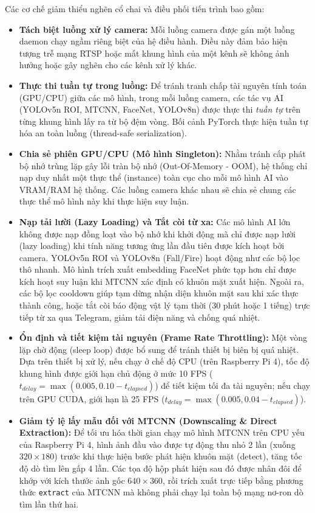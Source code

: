 \documentclass[12pt,a4paper]{article}
\begin{document}
Các cơ chế giảm thiểu nghẽn cổ chai và điều phối tiến trình bao gồm:
\begin{itemize}
    \item \textbf{Tách biệt luồng xử lý camera:} Mỗi luồng camera được gán một luồng daemon chạy ngầm riêng biệt của hệ điều hành. Điều này đảm bảo hiện tượng trễ mạng RTSP hoặc mất khung hình của một kênh sẽ không ảnh hưởng hoặc gây nghẽn cho các kênh xử lý khác.
    \item \textbf{Thực thi tuần tự trong luồng:} Để tránh tranh chấp tài nguyên tính toán (GPU/CPU) giữa các mô hình, trong mỗi luồng camera, các tác vụ AI (YOLOv5n ROI, MTCNN, FaceNet, YOLOv8n) được thực thi \textit{tuần tự} trên từng khung hình lấy ra từ bộ đệm vòng. Bối cảnh PyTorch thực hiện tuần tự hóa an toàn luồng (thread-safe serialization).
    \item \textbf{Chia sẻ phiên GPU/CPU (Mô hình Singleton):} Nhằm tránh cấp phát bộ nhớ trùng lặp gây lỗi tràn bộ nhớ (Out-Of-Memory - OOM), hệ thống chỉ nạp duy nhất một thực thể (instance) toàn cục cho mỗi mô hình AI vào VRAM/RAM hệ thống. Các luồng camera khác nhau sẽ chia sẻ chung các thực thể mô hình này khi thực hiện suy luận.
    \item \textbf{Nạp tải lười (Lazy Loading) và Tắt còi từ xa:} Các mô hình AI lớn không được nạp đồng loạt vào bộ nhớ khi khởi động mà chỉ được nạp lười (lazy loading) khi tính năng tương ứng lần đầu tiên được kích hoạt bởi camera. YOLOv5n ROI và YOLOv8n (Fall/Fire) hoạt động như các bộ lọc thô nhanh. Mô hình trích xuất embedding FaceNet phức tạp hơn chỉ được kích hoạt suy luận khi MTCNN xác định có khuôn mặt xuất hiện. Ngoài ra, các bộ lọc cooldown giúp tạm dừng nhận diện khuôn mặt sau khi xác thực thành công, hoặc tắt còi báo động vật lý tạm thời (30 phút hoặc 1 tiếng) trực tiếp từ xa qua Telegram, giảm tải điện năng và chống quá nhiệt.
    \item \textbf{Ổn định và tiết kiệm tài nguyên (Frame Rate Throttling):} Một vòng lặp chờ động (sleep loop) được bổ sung để tránh thiết bị biên bị quá nhiệt. Dựa trên thiết bị xử lý, nếu chạy ở chế độ CPU (trên Raspberry Pi 4), tốc độ khung hình được giới hạn chủ động ở mức 10 FPS ($t_{delay} = \max(0.005, 0.10 - t_{elapsed})$) để tiết kiệm tối đa tài nguyên; nếu chạy trên GPU CUDA, giới hạn là 25 FPS ($t_{delay} = \max(0.005, 0.04 - t_{elapsed})$).
    \item \textbf{Giảm tỷ lệ lấy mẫu đối với MTCNN (Downscaling \& Direct Extraction):} Để tối ưu hóa thời gian chạy mô hình MTCNN trên CPU yếu của Raspberry Pi 4, hình ảnh đầu vào được tự động thu nhỏ 2 lần (xuống $320 \times 180$) trước khi thực hiện bước phát hiện khuôn mặt (detect), tăng tốc độ dò tìm lên gấp 4 lần. Các tọa độ hộp phát hiện sau đó được nhân đôi để khớp với kích thước ảnh gốc $640 \times 360$, rồi trích xuất trực tiếp bằng phương thức \texttt{extract} của MTCNN mà không phải chạy lại toàn bộ mạng nơ-ron dò tìm lần thứ hai.
\end{itemize}
\end{document}

